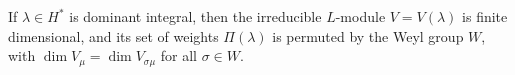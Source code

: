 If $\lambda \in H^*$ is dominant integral, then the irreducible $L$-module $V = V(\lambda)$ is finite dimensional, and its set of weights $\Pi(\lambda)$ is permuted by the Weyl group $W$, with $\dim V_\mu = \dim V_{\sigma\mu}$ for all $\sigma \in W$.
